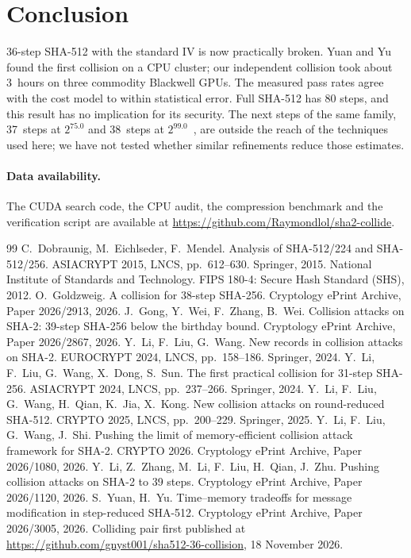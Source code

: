 \documentclass[11pt]{article}
\begin{document}
\section{Conclusion}

36-step SHA-512 with the standard IV is now practically broken. Yuan and Yu~\cite{YY26} found the first collision on a CPU cluster; our independent collision took about 3~hours on three commodity Blackwell GPUs. The measured pass rates agree with the cost model to within statistical error. Full SHA-512 has 80 steps, and this result has no implication for its security. The next steps of the same family, 37~steps at $2^{75.0}$ and 38~steps at $2^{99.0}$~\cite{YY26}, are outside the reach of the techniques used here; we have not tested whether similar refinements reduce those estimates.

\paragraph{Data availability.} The CUDA search code, the CPU audit, the compression benchmark and the verification script are available at \url{https://github.com/Raymondlol/sha2-collide}.

\begin{thebibliography}{99}
 C.~Dobraunig, M.~Eichlseder, F.~Mendel. Analysis of SHA-512/224 and SHA-512/256. ASIACRYPT 2015, LNCS, pp.~612--630. Springer, 2015.
 National Institute of Standards and Technology. FIPS 180-4: Secure Hash Standard (SHS), 2012.
 O.~Goldzweig. A collision for 38-step SHA-256. Cryptology ePrint Archive, Paper 2026/2913, 2026.
 J.~Gong, Y.~Wei, F.~Zhang, B.~Wei. Collision attacks on SHA-2: 39-step SHA-256 below the birthday bound. Cryptology ePrint Archive, Paper 2026/2867, 2026.
 Y.~Li, F.~Liu, G.~Wang. New records in collision attacks on SHA-2. EUROCRYPT 2024, LNCS, pp.~158--186. Springer, 2024.
 Y.~Li, F.~Liu, G.~Wang, X.~Dong, S.~Sun. The first practical collision for 31-step SHA-256. ASIACRYPT 2024, LNCS, pp.~237--266. Springer, 2024.
 Y.~Li, F.~Liu, G.~Wang, H.~Qian, K.~Jia, X.~Kong. New collision attacks on round-reduced SHA-512. CRYPTO 2025, LNCS, pp.~200--229. Springer, 2025.
 Y.~Li, F.~Liu, G.~Wang, J.~Shi. Pushing the limit of memory-efficient collision attack framework for SHA-2. CRYPTO 2026. Cryptology ePrint Archive, Paper 2026/1080, 2026.
 Y.~Li, Z.~Zhang, M.~Li, F.~Liu, H.~Qian, J.~Zhu. Pushing collision attacks on SHA-2 to 39 steps. Cryptology ePrint Archive, Paper 2026/1120, 2026.
 S.~Yuan, H.~Yu. Time--memory tradeoffs for message modification in step-reduced SHA-512. Cryptology ePrint Archive, Paper 2026/3005, 2026. Colliding pair first published at \url{https://github.com/gnyst001/sha512-36-collision}, 18 November 2026.
\end{thebibliography}
\end{document}
